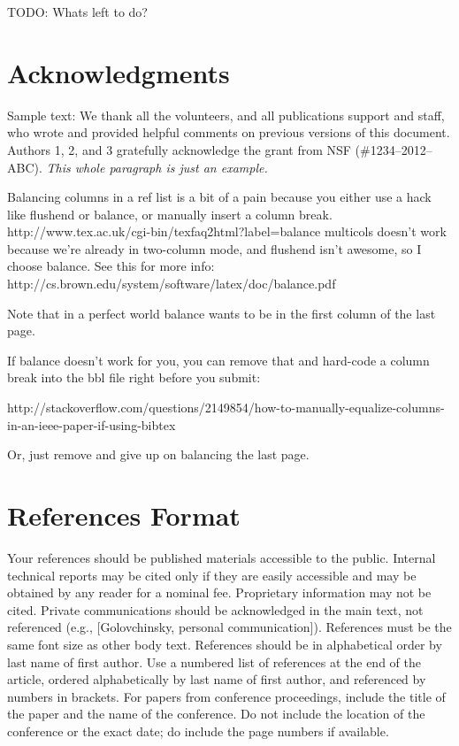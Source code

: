 \documentclass{sigchi}
\begin{document}
TODO: Whats left to do?

\section{Acknowledgments}

Sample text: We thank all the volunteers, and all publications support
and staff, who wrote and provided helpful comments on previous
versions of this document. Authors 1, 2, and 3 gratefully acknowledge
the grant from NSF (\#1234--2012--ABC). \textit{This whole paragraph is
  just an example.}

 Balancing columns in a ref list is a bit of a pain because you
 either use a hack like flushend or balance, or manually insert
 a column break.  http://www.tex.ac.uk/cgi-bin/texfaq2html?label=balance
 multicols doesn't work because we're already in two-column mode,
 and flushend isn't awesome, so I choose balance.  See this
 for more info: http://cs.brown.edu/system/software/latex/doc/balance.pdf

 Note that in a perfect world balance wants to be in the first
 column of the last page.

 If balance doesn't work for you, you can remove that and
 hard-code a column break into the bbl file right before you
 submit:

 http://stackoverflow.com/questions/2149854/how-to-manually-equalize-columns-
 in-an-ieee-paper-if-using-bibtex

 Or, just remove \balance and give up on balancing the last page.

\balance{}

\section{References Format}
Your references should be published materials accessible to the
public. Internal technical reports may be cited only if they are
easily accessible and may be obtained by any reader for a nominal
fee. Proprietary information may not be cited. Private communications
should be acknowledged in the main text, not referenced (e.g.,
[Golovchinsky, personal communication]). References must be the same
font size as other body text. References should be in alphabetical
order by last name of first author. Use a numbered list of references
at the end of the article, ordered alphabetically by last name of
first author, and referenced by numbers in brackets. For papers from
conference proceedings, include the title of the paper and the name of
the conference. Do not include the location of the conference or the
exact date; do include the page numbers if available. 
\end{document}
